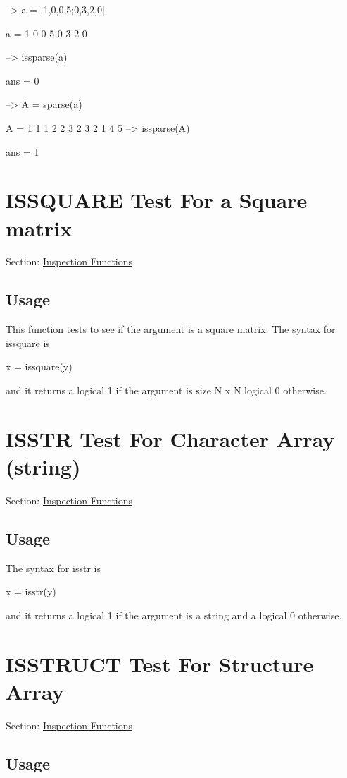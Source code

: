 \begin{DoxyVerbInclude}
--> a = [1,0,0,5;0,3,2,0]

a = 
 1 0 0 5 
 0 3 2 0 

--> issparse(a)

ans = 
 0 

--> A = sparse(a)

A = 
 1 1 1
 2 2 3
 2 3 2
 1 4 5
--> issparse(A)

ans = 
 1 
\end{DoxyVerbInclude}
 \hypertarget{inspection_issquare}{}\section{I\-S\-S\-Q\-U\-A\-R\-E Test For a Square matrix}\label{inspection_issquare}
Section\-: \hyperlink{sec_inspection}{Inspection Functions} \hypertarget{vtkwidgets_vtkxyplotwidget_Usage}{}\subsection{Usage}\label{vtkwidgets_vtkxyplotwidget_Usage}
This function tests to see if the argument is a square matrix. The syntax for {\ttfamily issquare} is \begin{DoxyVerb}   x = issquare(y)
\end{DoxyVerb}
 and it returns a logical 1 if the argument is size {\ttfamily N x N} logical 0 otherwise. \hypertarget{inspection_isstr}{}\section{I\-S\-S\-T\-R Test For Character Array (string)}\label{inspection_isstr}
Section\-: \hyperlink{sec_inspection}{Inspection Functions} \hypertarget{vtkwidgets_vtkxyplotwidget_Usage}{}\subsection{Usage}\label{vtkwidgets_vtkxyplotwidget_Usage}
The syntax for {\ttfamily isstr} is \begin{DoxyVerb}   x = isstr(y)
\end{DoxyVerb}
 and it returns a logical 1 if the argument is a string and a logical 0 otherwise. \hypertarget{inspection_isstruct}{}\section{I\-S\-S\-T\-R\-U\-C\-T Test For Structure Array}\label{inspection_isstruct}
Section\-: \hyperlink{sec_inspection}{Inspection Functions} \hypertarget{vtkwidgets_vtkxyplotwidget_Usage}{}\subsection{Usage}\label{vtkwidgets_vtkxyplotwidget_Usage}

